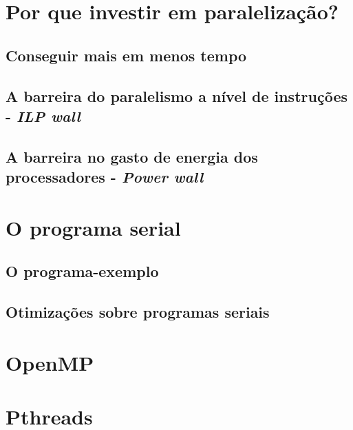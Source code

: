 		    
	\chapter{Por que investir em paralelização?}
	
		\section{Conseguir mais em menos tempo}
		
	
		\section{A barreira do paralelismo a nível de instruções - \textit{ILP wall}}
		
		\section{A barreira no gasto de energia dos processadores - \textit{Power wall}}
	
    \chapter{O programa serial}
    
	    \section{O programa-exemplo}
	    
	    \section{Otimizações sobre programas seriais}
    
    \chapter{OpenMP}
    
    \chapter{Pthreads}
    
